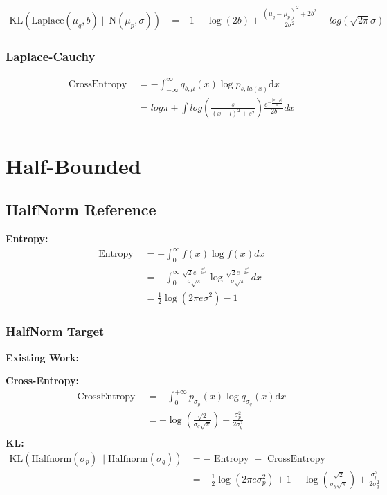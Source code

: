 \documentclass{article}
\begin{document}
$$ \begin{aligned} \mathrm{KL}\left(\mathrm{Laplace}\left(\mu_{q}, b\right) \| \mathrm{N}\left(\mu_{p}, \sigma\right)\right)&= -1-\log \left(2 b\right)+\frac{(\mu_{q}-\mu_{p})^{2}+2b^{2}}{2\sigma^{2}}+log(\sqrt{2\pi}\sigma) 
 \end{aligned}
 $$
 
\subsubsection{Laplace-Cauchy}
$$ \begin{aligned} \text { CrossEntropy }&=
-\int_{-\infty}^{\infty} q_{b,\mu}(x) \log p_{s, la(x)} \mathrm{d} x \\
&=log\pi+ \int log(\frac{s}{(x-l)^{2}+s^{2}} )\frac{e^{-\frac{\left | x-\mu \right | }{b} } }{2b} dx \\
\end{aligned}
 $$
 
\section{Half-Bounded}
\subsection{HalfNorm Reference}

\noindent \textbf{Entropy:}
$$ \begin{aligned} \text { Entropy }&=-\int_{0}^{\infty} f(x) \log f(x) d x\\&=-\int_{0}^{\infty}\frac{\sqrt{2}e^{-\frac{x^{2} }{2\sigma^{2}}}}{\sigma\sqrt{\pi}}\log\frac{\sqrt{2}e^{-\frac{x^{2} }{2\sigma^{2}}}}{\sigma\sqrt{\pi}} d x\\&=\frac{1}{2} \log\left(2 \pi e \sigma^{2}\right)-1
\end{aligned} $$

\subsubsection{HalfNorm Target}

\noindent \textbf{Existing Work:}

\noindent \textbf{Cross-Entropy:}
$$ \begin{aligned} \text { CrossEntropy }&=-\int_{0}^{+\infty} p_{\sigma_{p}}(x) \log q_{\sigma_{q}}(x) \mathrm{d} x \\&=
-\log(\frac{\sqrt{2}}{\sigma_{q}\sqrt{\pi}} )+\frac{\sigma_{p}^{2}}{2\sigma_{q}^{2}} \\
\end{aligned} $$
\noindent \textbf{KL:}
$$ \begin{aligned}\mathrm{KL}\left(\mathrm{Halfnorm}\left(\sigma_{p}\right) \| \mathrm{Halfnorm}\left(\sigma_{q}\right)\right)&=-\text { Entropy }+\text{ CrossEntropy }\\&=
- \frac{1}{2} \log\left(2 \pi e \sigma_{p}^{2}\right)+1 -\log(\frac{\sqrt{2}}{\sigma_{q}\sqrt{\pi}} )+\frac{\sigma_{p}^{2}}{2\sigma_{q}^{2}} \\
\end{aligned} $$
\end{document}
